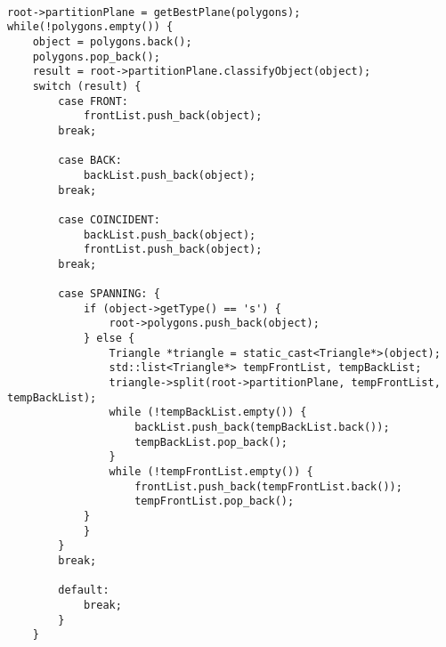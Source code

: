 \begin{lstlisting}[caption={Fragment klasy \emph{BSP} - budowa drzewa}]

root->partitionPlane = getBestPlane(polygons);
while(!polygons.empty()) {
    object = polygons.back();
    polygons.pop_back();
    result = root->partitionPlane.classifyObject(object);
    switch (result) {
        case FRONT:
            frontList.push_back(object);
        break;

        case BACK:
            backList.push_back(object);
        break;

        case COINCIDENT:
            backList.push_back(object);
            frontList.push_back(object);
        break;

        case SPANNING: {
            if (object->getType() == 's') {
                root->polygons.push_back(object);
            } else {
                Triangle *triangle = static_cast<Triangle*>(object);
                std::list<Triangle*> tempFrontList, tempBackList;
                triangle->split(root->partitionPlane, tempFrontList, tempBackList);
                while (!tempBackList.empty()) {
                    backList.push_back(tempBackList.back());
                    tempBackList.pop_back();
                }
                while (!tempFrontList.empty()) {
                    frontList.push_back(tempFrontList.back());
                    tempFrontList.pop_back();
            }
            }
        }
        break;

        default:
            break;
        }
    }
\end{lstlisting}


